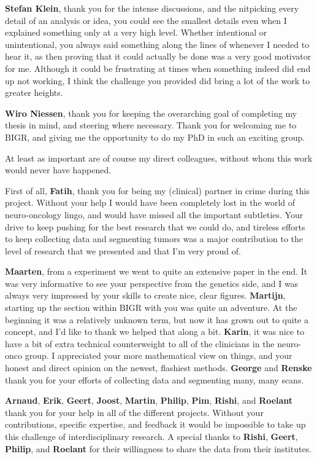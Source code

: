 \textbf{Stefan Klein}, thank you for the intense discussions, and the nitpicking every detail of an analysis or idea, you could see the smallest details even when I explained something only at a very high level.
Whether intentional or unintentional, you always said something along the lines of  whenever I needed to hear it, as then proving that it could actually be done was a very good motivator for me.
Although it could be frustrating at times when something indeed did end up not working, I think the challenge you provided did bring a lot of the work to greater heights.

\textbf{Wiro Niessen}, thank you for keeping the overarching goal of completing my thesis in mind, and steering where necessary.
Thank you for welcoming me to BIGR, and giving me the opportunity to do my PhD in such an exciting group.

At least as important are of course my direct colleagues, without whom this work would never have happened.

First of all, \textbf{Fatih}, thank you for being my (clinical) partner in crime during this project.
Without your help I would have been completely lost in the world of neuro-oncology lingo, and would have missed all the important subtleties.
Your drive to keep pushing for the best research that we could do, and tireless efforts to keep collecting data and segmenting tumors was a major contribution to the level of research that we presented and that I'm very proud of.

\textbf{Maarten}, from a  experiment we went to quite an extensive paper in the end.
It was very informative to see your perspective from the genetics side, and I was always very impressed by your skills to create nice, clear figures.
\textbf{Martijn}, starting up the  section within BIGR with you was quite an adventure.
At the beginning it was a relatively unknown term, but now it has grown out to quite a concept, and I'd like to thank we helped that along a bit.
\textbf{Karin}, it was nice to have a bit of extra technical counterweight to all of the clinicians in the neuro-onco group.
I appreciated your more mathematical view on things, and your honest and direct opinion on the newest, flashiest methods.
\textbf{George} and \textbf{Renske} thank you for your efforts of collecting data and segmenting many, many scans.

\textbf{Arnaud}, \textbf{Erik}, \textbf{Geert}, \textbf{Joost}, \textbf{Martin}, \textbf{Philip}, \textbf{Pim}, \textbf{Rishi}, and \textbf{Roelant} thank you for your help in all of the different projects.
Without your contributions, specific expertise, and feedback it would be impossible to take up this challenge of interdisciplinary research.
A special thanks to \textbf{Rishi}, \textbf{Geert}, \textbf{Philip}, and \textbf{Roelant} for their willingness to share the data from their institutes.

